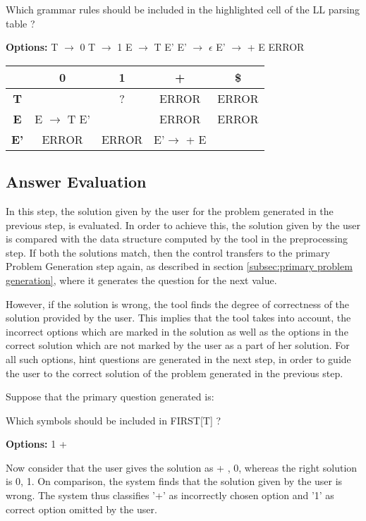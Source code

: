 \begin{example}
Which grammar rules should be included in the highlighted cell of the LL parsing table ?

\textbf{Options:} T $\to$ 0 \quad T $\to$ 1 \quad E $\to$ T E' \quad E' $\to$ $\epsilon$ \quad E' $\to$ + E \quad ERROR
\begin{center}
\begin{tabular}{ |c|c|c|c|c| } 
 \hline
  & \textbf{0} & \textbf{1} & \textbf{+} & \textbf{\$} \\
 \hline
 \textbf{T} &   & ? & ERROR & ERROR \\
 \hline
 \textbf{E} & E $\to$ T E' &   & ERROR & ERROR \\
 \hline
 \textbf{E'} & ERROR & ERROR & E'$\to$ + E &  \\
 \hline
\end{tabular}
\end{center}

\end{example}

\subsection{Answer Evaluation}
\label{subsec:answer evaluation}
In this step, the solution given by the user for the problem generated in the previous step, is evaluated. In order to achieve this, the solution given by the user is compared with the data structure computed by the tool in the preprocessing step. If both the solutions match, then the control transfers to the primary Problem Generation step again, as described in section \ref{subsec:primary problem generation}, where it generates the question for the next value.

However, if the solution is wrong, the tool finds the degree of correctness of the solution provided by the user. This implies that the tool takes into account, the incorrect options which are marked in the solution as well as the options in the correct solution which are not marked by the user as a part of her solution. For all such options, hint questions are generated in the next step, in order to guide the user to the correct solution of the problem generated in the previous step.
\begin{example}
\label{ex:answer evaluation}
Suppose that the primary question generated is:

Which symbols should be included in FIRST[T] ?

\textbf{Options:} 1  \qquad +

Now consider that the user gives the solution as {+ , 0}, whereas the right solution is {0, 1}. On comparison, the system finds that the solution given by the user is wrong. The system thus classifies '+' as incorrectly chosen option and '1' as correct option omitted by the user.
\end{example}

